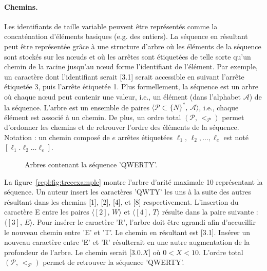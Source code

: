 \paragraph{Chemins.}

Les identifiants de taille variable peuvent être représentés comme la
concaténation d'éléments basiques (e.g. des entiers). La séquence en résultant
peut être représentée grâce à une structure d'arbre où les éléments de la
séquence sont stockés sur les nœuds et où les arrêtes sont étiquetées de telle
sorte qu'un chemin de la racine jusqu'au nœud forme l'identifiant de
l'élément. Par exemple, un caractère dont l'identifiant serait [3.1] serait
accessible en suivant l'arrête étiquetée 3, puis l'arrête étiquetée 1. Plus
formellement, la séquence est un arbre où chaque nœud peut contenir une valeur,
i.e., un élément (dans l'alphabet $\mathcal{A}$) de la séquence. L'arbre est un
ensemble de paires $\langle \mathcal{P}\subset \{N\}^*,\, \mathcal{A} \rangle$,
i.e., chaque élément est associé à un chemin. De plus, un ordre total
$(\mathcal{P},\, <_\mathcal{P})$ permet d'ordonner les chemins et de retrouver
l'ordre des éléments de la séquence. Notation : un chemin composé de $e$ arrêtes
étiquetées $\ell_1,\,\ell_2,\ldots,\ell_e$ est noté
$[\ell_1.\ell_2\ldots\ell_e]$.

\begin{figure}
  \centering
  \hspace{20pt}
  \caption{Arbres contenant la séquence 'QWERTY'.}
\end{figure}

La figure~\ref{repl:fig:treeexample} montre l'arbre d'arité maximale 10
représentant la séquence. Un auteur insert les caractères 'QWTY' les uns à la
suite des autres résultant dans les chemins [1], [2], [4], et [8]
respectivement. L'insertion du caractère E entre les paires
$\langle [2],\,W \rangle$ et $\langle [4],\, T \rangle$ résulte dans la paire
suivante : $\langle [3],\, E \rangle$. Pour insérer le caractère 'R', l'arbre
doit être agrandi afin d'accueillir le nouveau chemin entre 'E' et 'T'. Le
chemin en résultant est [3.1]. Insérer un nouveau caractère entre 'E' et 'R'
résulterait en une autre augmentation de la profondeur de l'arbre. Le chemin
serait [3.0.$X$] où $0<X<10$. L'ordre total $(\mathcal{P},\, <_\mathcal{P})$
permet de retrouver la séquence 'QWERTY'.



